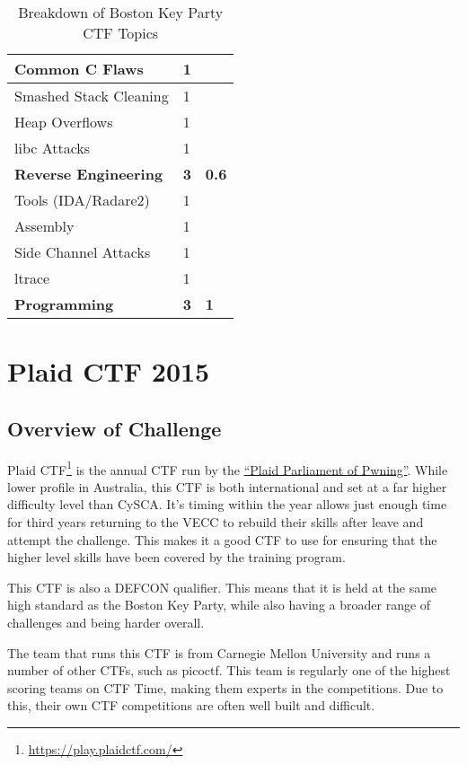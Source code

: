 \documentclass[a4paper,11pt]{report}
\begin{document}
\begin{table}[htb]
\begin{tabular}{| l | l | l |}
				\quad Common C Flaws & 1 & \\ \hline 
				\quad Smashed Stack Cleaning & 1 & \\ \hline 
				\quad Heap Overflows & 1 & \\ \hline 
				\quad libc Attacks & 1 & \\ \hline 
				\textbf{Reverse Engineering} & \textbf{3} & \textbf{0.6} \\ \hline
				\quad Tools (IDA/Radare2) & 1 & \\ \hline 
				\quad Assembly & 1 & \\ \hline 
				\quad Side Channel Attacks & 1 & \\ \hline 
				\quad ltrace & 1 & \\ \hline 
				\textbf{Programming} & \textbf{3} & \textbf{1}\\ \hline
			\end{tabular}
			\caption{Breakdown of Boston Key Party CTF Topics}
			\label{tab:BCTFBreakdown}
		\end{table}
\chapter{Plaid CTF 2015}
	\section{Overview of Challenge}
		Plaid CTF\footnote{\url{https://play.plaidctf.com/}} is the annual CTF run by the \href{http://pwning.net/}{``Plaid Parliament of Pwning''}.
		While lower profile in Australia, this CTF is both international and set at a far higher difficulty level than CySCA. 
		It's timing within the year allows just enough time for third years returning to the VECC to rebuild their skills after leave and attempt the challenge. 
		This makes it a good CTF to use for ensuring that the higher level skills have been covered by the training program. 

		This CTF is also a DEFCON qualifier. 
		This means that it is held at the same high standard as the Boston Key Party, while also having a broader range of challenges and being harder overall. 

		The team that runs this CTF is from Carnegie Mellon University and runs a number of other CTFs, such as picoctf. 
		This team is regularly one of the highest scoring teams on CTF Time, making them experts in the competitions. 
		Due to this, their own CTF competitions are often well built and difficult. 
	
\end{document}
